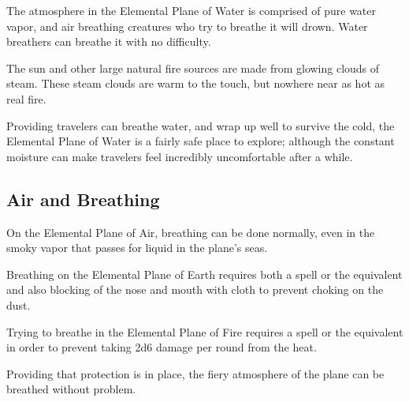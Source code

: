 \begin{multicols*}{2}
The atmosphere in the Elemental Plane of Water is comprised of pure water vapor, and air breathing creatures who try to breathe it will drown. Water breathers can breathe it with no difficulty.

The sun and other large natural fire sources are made from glowing clouds of steam. These steam clouds are warm to the touch, but nowhere near as hot as real fire.

Providing travelers can breathe water, and wrap up well to survive the cold, the Elemental Plane of Water is a fairly safe place to explore; although the constant moisture can make travelers feel incredibly uncomfortable after a while.


\subsection{Air and Breathing}
On the Elemental Plane of Air, breathing can be done normally, even in the smoky vapor that passes for liquid in the plane’s seas.

Breathing on the Elemental Plane of Earth requires both a  spell or the equivalent and also blocking of the nose and mouth with cloth to prevent choking on the dust.

Trying to breathe in the Elemental Plane of Fire requires a  spell or the equivalent in order to prevent taking 2d6 damage per round from the heat.

Providing that protection is in place, the fiery atmosphere of the plane can be breathed without problem.


\end{multicols*}
